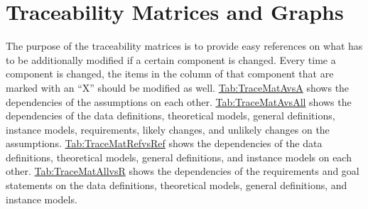 \documentclass[12pt]{article}
\begin{document}
{\section{Traceability Matrices and Graphs}
\label{Sec:TraceMatrices}
The purpose of the traceability matrices is to provide easy references on what has to be additionally modified if a certain component is changed. Every time a component is changed, the items in the column of that component that are marked with an ``X'' should be modified as well. \hyperref[Table:TraceMatAvsA]{Tab:TraceMatAvsA} shows the dependencies of the assumptions on each other. \hyperref[Table:TraceMatAvsAll]{Tab:TraceMatAvsAll} shows the dependencies of the data definitions, theoretical models, general definitions, instance models, requirements, likely changes, and unlikely changes on the assumptions. \hyperref[Table:TraceMatRefvsRef]{Tab:TraceMatRefvsRef} shows the dependencies of the data definitions, theoretical models, general definitions, and instance models on each other. \hyperref[Table:TraceMatAllvsR]{Tab:TraceMatAllvsR} shows the dependencies of the requirements and goal statements on the data definitions, theoretical models, general definitions, and instance models.

}
\end{document}

